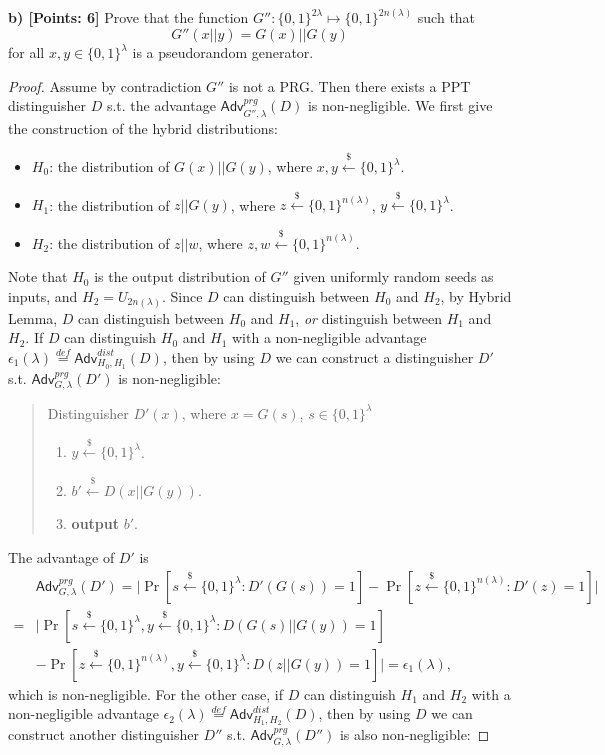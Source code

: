 \documentclass[12pt]{article}
\newcommand{\eqdef}{\stackrel{def}{=}}
\newcommand{\bits}{\{0,1\}}
\newcommand{\getsr}{\stackrel{\$}{\gets}}
\newcommand{\Adv}{\textsf{Adv}}
\theoremstyle{definition}
\begin{document}
{\bf b) [Points: 6]} Prove that the function $G'' : \bits^{2\lambda} \mapsto \bits^{2n(\lambda)}$ such that
$$G''(x||y) = G(x)||G(y)$$
for all $x,y\in\bits^\lambda$ is a pseudorandom generator.
\begin{proof}
Assume by contradiction $G''$ is not a PRG. Then there exists a PPT distinguisher $D$ s.t. the advantage $\Adv_{G'',\lambda}^{prg}(D)$ is non-negligible. We first give the construction of the hybrid distributions:
\begin{itemize}
\item $H_0$: the distribution of $G(x)||G(y)$, where $x, y \getsr\bits^\lambda$.
\item $H_1$: the distribution of $z||G(y)$, where $z\getsr\bits^{n(\lambda)}$, $y\getsr\bits^\lambda$.
\item $H_2$: the distribution of $z||w$, where $z,w\getsr\bits^{n(\lambda)}$.
\end{itemize}
Note that $H_0$ is the output distribution of $G''$ given uniformly random seeds as inputs, and $H_2 = U_{2n(\lambda)}$.
Since $D$ can distinguish between $H_0$ and $H_2$, by Hybrid Lemma, $D$ can distinguish between $H_0$ and $H_1$, \emph{or} distinguish between $H_1$ and $H_2$. If $D$ can distinguish $H_0$ and $H_1$ with a non-negligible advantage $\epsilon_1(\lambda) \eqdef \Adv_{H_0,H_1}^{dist}(D)$, then by using $D$ we can construct a distinguisher $D'$ s.t. $\Adv_{G,\lambda}^{prg}(D')$ is non-negligible:
\begin{quote}
Distinguisher $D' (x)$, where $x=G(s)$, $s\in\bits^\lambda$
\begin{enumerate}
\item $y\getsr\bits^{\lambda}$.
\item $b' \getsr D(x||G(y))$.
\item {\bf output} $b'$.
\end{enumerate}
\end{quote}
The advantage of $D'$ is 
$$
\begin{aligned}
& \Adv_{G,\lambda}^{prg}(D') 
= \bigg| \Pr[s\getsr\bits^\lambda : D'(G(s))=1] - \Pr[z\getsr\bits^{n(\lambda)}: D'(z)=1] \bigg| \\
=& \bigg| \Pr[s\getsr\bits^\lambda, y\getsr\bits^\lambda : D(G(s)||G(y))=1]\\
& - \Pr[z\getsr\bits^{n(\lambda)}, y\getsr\bits^\lambda: D(z||G(y))=1] \bigg| 
= \epsilon_1(\lambda),
\end{aligned}
$$
which is non-negligible. For the other case, if $D$ can distinguish $H_1$ and $H_2$ with a non-negligible advantage $\epsilon_2(\lambda) \eqdef \Adv_{H_1,H_2}^{dist}(D)$, then by using $D$ we can construct another distinguisher $D''$ s.t. $\Adv_{G,\lambda}^{prg}(D'')$ is also non-negligible:

\end{proof}
\end{document}
